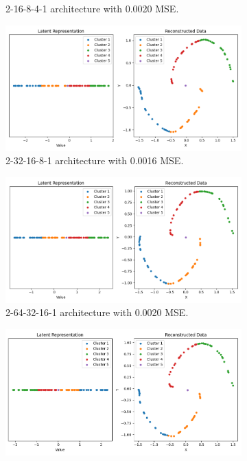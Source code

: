 \begin{figure}[htb]
\begin{subfigure}[b]{0.49\textwidth}
    \caption{2-16-8-4-1 architecture with \textcolor{green!40!black}{0.0020} MSE.}
    \label{fig:2-16-8-4-1}
  \end{subfigure}
  \hfill
  \begin{subfigure}[b]{0.49\textwidth}
    \centering
    \includegraphics[width=\linewidth]{images/RQ1/2-32-16-8-1_0.0016.png}
    \caption{2-32-16-8-1 architecture with \textcolor{green!100!black}{0.0016} MSE.}
    \label{fig:2-32-16-8-1}
  \end{subfigure}
  \hfill
  \begin{subfigure}[b]{0.49\textwidth}
    \centering
    \includegraphics[width=\linewidth]{images/RQ1/2-64-32-16-1_0.0020.png}
    \caption{2-64-32-16-1 architecture with \textcolor{green!40!black}{0.0020} MSE.}
    \label{fig:2-64-32-16-1}
  \end{subfigure}
  \hfill
  \begin{subfigure}[b]{0.49\textwidth}
    \centering
    \includegraphics[width=\linewidth]{images/RQ1/2-128-64-32-1_0.0026.png}

\end{subfigure}
\end{figure}
